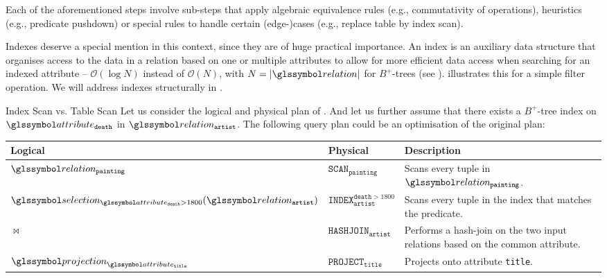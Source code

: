 Each of the aforementioned steps involve sub-steps that apply algebraic equivalence rules \cite{Garcia:2009Database}  (e.g., commutativity of operations), heuristics \cite{Garcia:2009Database,Graefe:1993Query,Swami:1989Optimization,Bruno:2010Polynomial,Tsialiamanis:2012Heuristics,} (e.g., predicate pushdown) or special rules to handle certain (edge-)cases \cite{Jarke:1984Query,Graefe:1993Query} (e.g., replace table by index scan). 

Indexes deserve a special mention in this context, since they are of huge practical importance. An index is an auxiliary data structure that organises access to the data in a relation based on one or multiple attributes to allow for more efficient data access when searching for an indexed attribute -- $\mathcal{O}(\log N)$ instead of $\mathcal{O}(N)$, with $N = |\relation|$ for $B^{+}$-trees (see ).  illustrates this for a simple filter operation. We will address indexes structurally in .

\begin{example}[label=example:index_scan]{Index Scan vs. Table Scan}{}
    Let us consider the logical and physical plan of . And let us further assume that there exists a $B^{+}$-tree index on $\attribute_{\mathtt{death}}$ in $\relation_{\mathtt{artist}}$. The following query plan could be an optimisation of the original plan:

    \begin{center}
        \begin{tabular}{| l | l | p{6cm} |}
            \hline
            \textbf{Logical} & \textbf{Physical} & \textbf{Description} \\ 
            \hline
            \hline
            $\relation_{\mathtt{painting}}$ & $\mathtt{SCAN}_{\mathtt{painting}}$ & Scans every tuple in $\relation_{\mathtt{painting}}$. \\
            \hline
            $\selection_{\attribute_{\mathtt{death}} > 1800}(\relation_{\mathtt{artist}})$ & $\mathtt{INDEX}^{\mathtt{death} > 1800}_{\mathtt{artist}}$ & Scans every tuple in the index that matches the predicate. \\
            \hline
            $\Join$ & $\mathtt{HASHJOIN}_{\mathtt{artist}}$ & Performs a hash-join on the two input relations based on the common attribute. \\
            \hline
            $\projection_{\attribute_{\mathtt{title}}}$ & $\mathtt{PROJECT}_{\mathtt{title}}$ & Projects onto attribute \texttt{title}. \\
            \hline
        \end{tabular}
    \end{center}
\end{example}


